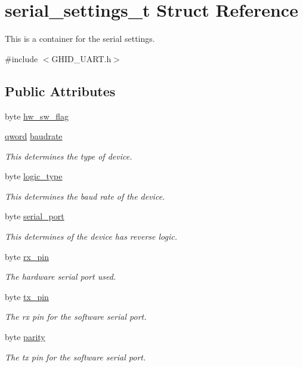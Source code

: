 \hypertarget{structserial__settings__t}{\section{serial\-\_\-settings\-\_\-t \-Struct \-Reference}
\label{structserial__settings__t}
}


\-This is a container for the serial settings.  




{\ttfamily \#include $<$\-G\-H\-I\-D\-\_\-\-U\-A\-R\-T.\-h$>$}

\subsection*{\-Public \-Attributes}
\begin{DoxyCompactItemize}
\item 
byte \hyperlink{structserial__settings__t_afcf0421e61f47f50a3498b2efc66f29c}{hw\-\_\-sw\-\_\-flag}
\item 
\hyperlink{_g_h_i_d___u_a_r_t_8h_a2a0bfb868d1d1fd77998400ab584e68c}{qword} \hyperlink{structserial__settings__t_a7bc4206000da0dbac55b20e32e9acb2c}{baudrate}
\begin{DoxyCompactList}\small\item\em \-This determines the type of device. \end{DoxyCompactList}\item 
byte \hyperlink{structserial__settings__t_ad5f8e5f4b2a37dac1c7abbf92edfd593}{logic\-\_\-type}
\begin{DoxyCompactList}\small\item\em \-This determines the baud rate of the device. \end{DoxyCompactList}\item 
byte \hyperlink{structserial__settings__t_abd1e231f87b8a7d963c09cb88a5aa5b6}{serial\-\_\-port}
\begin{DoxyCompactList}\small\item\em \-This determines of the device has reverse logic. \end{DoxyCompactList}\item 
byte \hyperlink{structserial__settings__t_a35ec7f2933e8dd3265de62ece1a2073c}{rx\-\_\-pin}
\begin{DoxyCompactList}\small\item\em \-The hardware serial port used. \end{DoxyCompactList}\item 
byte \hyperlink{structserial__settings__t_a0f93cf06b293d16a9988f160ff6bd796}{tx\-\_\-pin}
\begin{DoxyCompactList}\small\item\em \-The rx pin for the software serial port. \end{DoxyCompactList}\item 
byte \hyperlink{structserial__settings__t_a330dd78eab42531854bd6d83e5f9d495}{parity}
\begin{DoxyCompactList}\small\item\em \-The tx pin for the software serial port. \end{DoxyCompactList}\end{DoxyCompactItemize}


